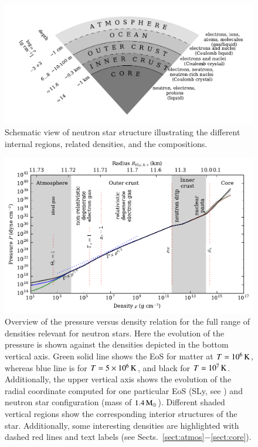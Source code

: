 \begin{figure}[t!]
\centering
\includegraphics[width=15cm]{figs/slice/atmos.pdf}
\caption{
Schematic view of neutron star structure illustrating the different internal regions, related densities, and the compositions.
}
\end{figure}


\begin{figure}[t!]
\centering
\includegraphics[width=15cm]{figs/eos/eos.pdf}
\caption{\label{fig:eos}
Overview of the pressure versus density relation for the full range of densities relevant for neutron stars.
Here the evolution of the pressure is shown against the densities depicted in the bottom vertical axis.
Green solid line shows the EoS for matter at $T=10^6\, \mathrm{K}$, whereas blue line is for $T=5 \times 10^{6}\, \mathrm{K}$, and black for $T=10^7 \, \mathrm{K}$.
Additionally, the upper vertical axis shows the evolution of the radial coordinate computed for one particular EoS (SLy, see ) and neutron star configuration (mass of $1.4\, \mathrm{M}_{\odot}$).
Different shaded vertical regions show the corresponding interior structures of the star.
Additionally, some interesting densities are highlighted with dashed red lines and text labels (see Sects.~\ref{sect:atmos}$-$\ref{sect:core}). 
}
\end{figure}


